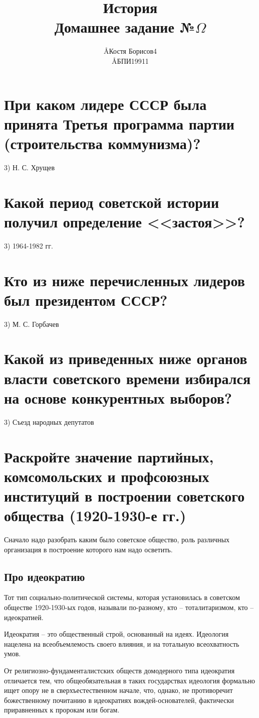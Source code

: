 \documentclass[12pt]{article}
\title{История \\ Домашнее задание №$\Omega$}
\author{\AA{Костя Борисов}{4} \\ \AA{БПИ199}{11}}
\begin{document}
  \maketitle

  \section{При каком лидере СССР была принята Третья программа партии (строительства коммунизма)?}
  3) Н. С. Хрущев

  \section{Какой период советской истории получил определение <<застоя>>?}
  3) 1964-1982 гг.

  \section{Кто из ниже перечисленных лидеров был президентом СССР?}
  3) М. С. Горбачев

  \section{Какой из приведенных ниже органов власти советского времени избирался на основе конкурентных выборов?}
  3) Съезд народных депутатов

  \newpage
  \section{Раскройте значение партийных, комсомольских и профсоюзных институций в построении советского общества (1920-1930-е гг.)}
  Сначало надо разобрать каким было советское общество, роль различных организация в построение которого нам надо осветить.

  \subsection{Про идеократию}
  Тот тип социально-политической системы, которая установилась в советском обществе 1920-1930-ых годов,
  называли по-разному, кто -- тоталитаризмом, кто -- идеократией.

  Идеократия -- это общественный строй, основанный на идеях.
  Идеология нацелена на всеобъемлемость своего влияния, и на тотальную всеохватность умов.

  От религиозно-фундаменталистских обществ домодерного типа идеократия отличается тем,
  что общеобязательная в таких государствах идеология формально ищет опору не в сверхъестественном начале,
  что, однако, не противоречит божественному почитанию в идеократиях вождей-основателей, фактически приравненных к пророкам или богам.
\end{document}
